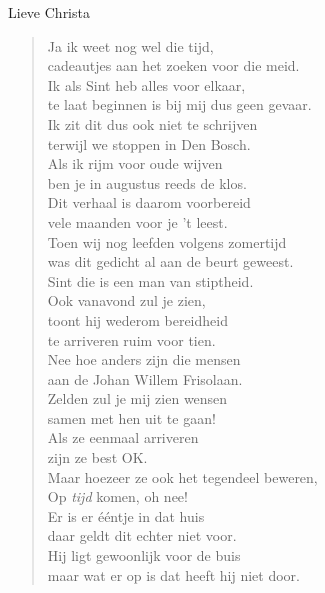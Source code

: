 \documentclass[12pt]{brief}
\date{12 augustus 2006}
\begin{document}
\begin{letter}{Lieve Christa}

\opening{}


\begin{verse}

Ja ik weet nog wel die tijd,\\
cadeautjes aan het zoeken voor die meid.\\
Ik als Sint heb alles voor elkaar,\\
te laat beginnen is bij mij dus geen gevaar.\\[1.5em]

Ik zit dit dus ook niet te schrijven\\
terwijl we stoppen in Den Bosch.\\
Als ik rijm voor oude wijven\\
ben je in augustus reeds de klos.\\[1.5em]

Dit verhaal is daarom voorbereid\\
vele maanden voor je 't leest.\\
Toen wij nog leefden volgens zomertijd\\
was dit gedicht al aan de beurt geweest.\\[1.5em]

Sint die is een man van stiptheid.\\
Ook vanavond zul je zien,\\
toont hij wederom bereidheid\\
te arriveren ruim voor tien.\\[1.5em]

Nee hoe anders zijn die mensen\\
aan de Johan Willem Frisolaan.\\
Zelden zul je mij zien wensen\\
samen met hen uit te gaan!\\[1.5em]

Als ze eenmaal arriveren\\
zijn ze best OK.\\
Maar hoezeer ze ook het tegendeel beweren,\\
Op \emph{tijd} komen, oh nee!\\[1.5em]

Er is er \'e\'entje in dat huis\\
daar geldt dit echter niet voor.\\
Hij ligt gewoonlijk voor de buis\\
maar wat er op is dat heeft hij niet door.\\[1.5em]


\end{verse}
\end{letter}
\end{document}
